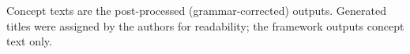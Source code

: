 \begin{table}[t]
\begin{tabularx}{\textwidth}{@{}c p{3.1cm} p{5.0cm} X@{}}
\bottomrule
\end{tabularx}
\begin{tablenotes}\footnotesize
\item Concept texts are the post-processed (grammar-corrected) outputs. Generated titles were
assigned by the authors for readability; the framework outputs concept text only.
\end{tablenotes}
\end{table}